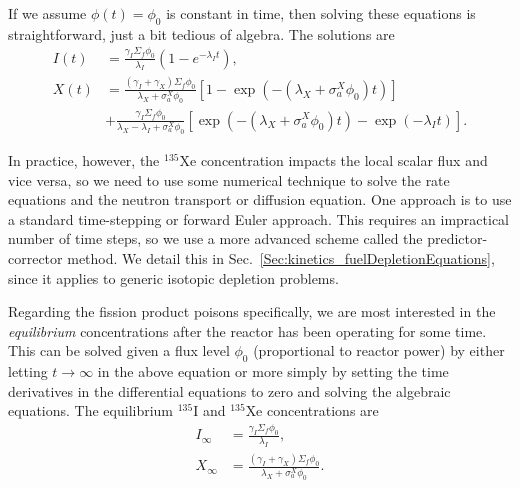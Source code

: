 If we assume $\phi(t) = \phi_0$ is constant in time, then solving these equations is straightforward, just a bit tedious of algebra. The solutions are
\begin{subequations}
\begin{align}
  I(t) &= \frac{ \gamma_I \Sigma_f \phi_0 }{ \lambda_I } \left( 1 - e^{-\lambda_I t } \right), \\
  X(t) 
  &= \frac{ ( \gamma_I + \gamma_X ) \Sigma_f \phi_0 }{ \lambda_X + \sigma_a^X \phi_0 } \left[ 1 - \exp \left( -\left( \lambda_X + \sigma_a^X \phi_0 \right) t \right) \right] \nonumber \\
  &+ \frac{ \gamma_I \Sigma_f \phi_0 }{ \lambda_X - \lambda_I + \sigma_a^X \phi_0 } \left[  \exp \left( -\left( \lambda_X + \sigma_a^X \phi_0 \right) t \right) - \exp \left( -\lambda_I t \right) \right] .
\end{align}
\end{subequations}

In practice, however, the $^{135}$Xe concentration impacts the local scalar flux and vice versa, so we need to use some numerical technique to solve the rate equations and the neutron transport or diffusion equation.  One approach is to use a standard time-stepping or forward Euler approach. This requires an impractical number of time steps, so we use a more advanced scheme called the predictor-corrector method. We detail this in Sec.~\ref{Sec:kinetics_fuelDepletionEquations}, since it applies to generic isotopic depletion problems.

Regarding the fission product poisons specifically, we are most interested in the \emph{equilibrium} concentrations after the reactor has been operating for some time. This can be solved given a flux level $\phi_0$ (proportional to reactor power) by either letting $t \rightarrow \infty$ in the above equation or more simply by setting the time derivatives in the differential equations to zero and solving the algebraic equations. The equilibrium $^{135}$I and $^{135}$Xe concentrations are
\begin{subequations} \label{Eq:kinetics_iodineXenonEquilibrium}
\begin{align}
  I_\infty &=  \frac{ \gamma_I \Sigma_f \phi_0 }{ \lambda_I } , \\
  X_\infty &=  \frac{ ( \gamma_I + \gamma_X ) \Sigma_f \phi_0 }{ \lambda_X + \sigma_a^X \phi_0  } . \label{Eq:kinetics_xenonEquilibrium}
\end{align}
\end{subequations}

